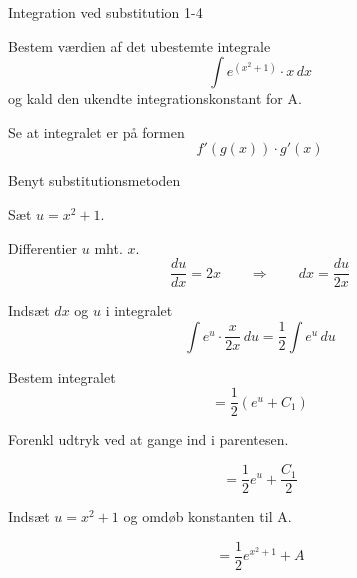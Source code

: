 \documentclass{article}
\begin{document}
\begin{exercise}{Integration ved substitution 1-4}
	
	
	Bestem værdien af det ubestemte integrale
	\[
	\int e^{(x^2+1)} \cdot x \, dx
	\]
	og kald den ukendte integrationskonstant for A.
	
	
	
	
	\hint
	
	Se at integralet er på formen
	\[
	f'(g(x)) \cdot g'(x)
	\]
	
	\hint
	
	Benyt substitutionsmetoden
	
	\hint
	
	Sæt $u=x^2+1$.
	
	
	\hint
	
	Differentier $u$ mht. $x$.
	\[
	\frac{du}{dx} = 2x \qquad	\Rightarrow \qquad dx = \frac{du}{2x}
	\]
	
	\hint
	
	Indsæt $dx$ og $u$ i integralet
	\[
	\int e^{u} \cdot \frac{x}{2x} \, du = \frac{1}{2} \int e^u \, du
	\]
	
	\hint
	
	Bestem integralet
	\[
	= \frac{1}{2} \left( e^u + C_1 \right)
	\]
	
	\hint
	Forenkl udtryk ved at gange ind i parentesen.
	
	\hint
	
	\[
	= \frac{1}{2} e^u + \frac{C_1}{2}
	\]
	
	\hint
	
	Indsæt $u = x^2+1$ og omdøb konstanten  til A.
	
	\hint
	
	\[
	= \frac{1}{2} e^{x^2+1} + A
	\]
	
	
\end{exercise}

\newpage
\end{document}
